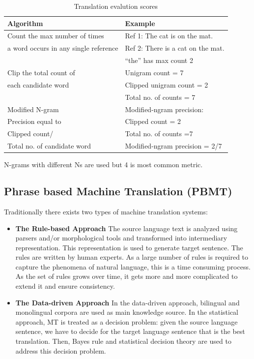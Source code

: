 \documentclass[a4paper]{article}
\begin{document}
\begin{table}[h]
  \centering
  \begin{tabular}{ll}
    \hline
    \textbf{Algorithm}  & \textbf{Example}  \\
    \hline
    Count the max number of times & Ref 1: The cat is on the mat.  \\
    a word occurs in any single reference & Ref 2: There is a cat on the mat. \\
    & “the” has max count 2 \\
    \hline
    Clip the total count of & Unigram count = 7 \\
    each candidate word & Clipped unigram count = 2 \\
    &Total no. of counts = 7 \\
    \hline
    Modified N-gram & Modified-ngram precision: \\
    Precision equal to & Clipped count = 2 \\
    Clipped count/ & Total no. of counts =7 \\
    Total no. of candidate word & Modified-ngram precision = 2/7\\
    \hline
  \end{tabular}
  \caption{Translation evalution scores}
\end{table}


N-grams with different Ns are used but 4 is most common metric.


\subsection{Phrase based Machine Translation (PBMT)}

Traditionally there exists two types of machine translation systems:

\begin{itemize}

  \item \textbf{The Rule-based Approach}
        The  source language text is analyzed using parsers and/or morphological
        tools   and   transformed  into    intermediary   representation.   This
        representation  is  used  to  generate  target  sentence.  The rules are
        written  by human  experts. As  a large number of  rules is  required to
        capture  the  phenomena  of natural language,  this is a  time consuming
        process.  As the set of rules grows over time, it gets more and more
        complicated to extend it and ensure consistency.

  \item \textbf{The Data-driven Approach}
        In the data-driven  approach, bilingual and monolingual corpora are used
        as main knowledge source.  In the statistical approach, MT is treated as
        a  decision problem:  given the  source  language  sentence,  we have to
        decide  for the  target language  sentence that is the best translation.
        Then,  Bayes rule  and  statistical  decision theory are used to address
        this decision problem.
\end{itemize}
\end{document}
